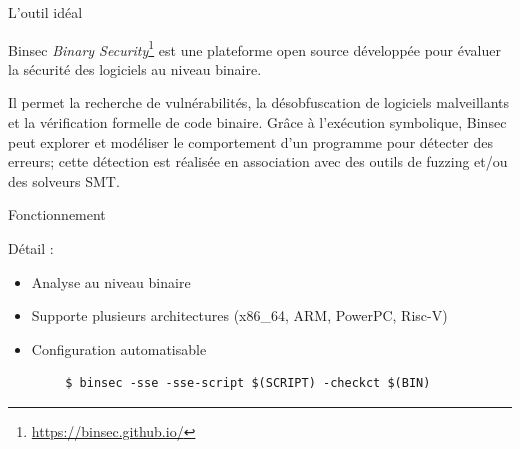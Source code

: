 \documentclass{backend/backend}
\begin{document}
\begin{frame}{L'outil idéal}
    \begin{exampleblock}{Binsec \cite{binsecRel2019}}
       \textit{Binary Security}\footnote{\url{https://binsec.github.io/}} est une plateforme open source développée pour évaluer la sécurité des logiciels au niveau binaire. \smallbreak
       
       Il permet la recherche de vulnérabilités, la désobfuscation de logiciels malveillants et la vérification formelle de code binaire. Grâce à l'exécution symbolique, Binsec peut explorer et modéliser le comportement d'un programme pour détecter des erreurs; cette détection est réalisée en association avec des outils de fuzzing et/ou des solveurs SMT.
    \end{exampleblock}
\end{frame}


\begin{frame}[fragile]{Fonctionnement}

    \begin{blockSimple}{Détail :}
        \begin{itemize}
            \item Analyse au niveau binaire
            \item Supporte plusieurs architectures (x86\_64, ARM, PowerPC, Risc-V)
            \item Configuration automatisable
        \end{itemize}
    \end{blockSimple}
    \centering
    \begin{verbatim}
        $ binsec -sse -sse-script $(SCRIPT) -checkct $(BIN)
    \end{verbatim}
\end{frame}
\end{document}
